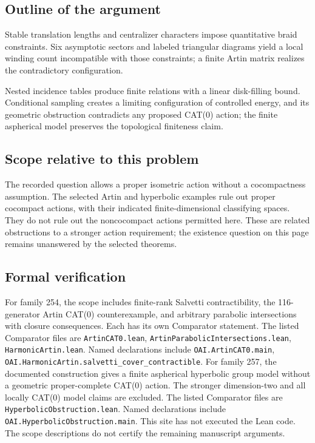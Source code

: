 \documentclass[11pt]{article}
\begin{document}
\subsection{Outline of the argument}
Stable translation lengths and centralizer characters impose quantitative braid constraints. Six asymptotic sectors and labeled triangular diagrams yield a local winding count incompatible with those constraints; a finite Artin matrix realizes the contradictory configuration.

Nested incidence tables produce finite relations with a linear disk-filling bound. Conditional sampling creates a limiting configuration of controlled energy, and its geometric obstruction contradicts any proposed CAT(0) action; the finite aspherical model preserves the topological finiteness claim.

\subsection{Scope relative to this problem}
The recorded question allows a proper isometric action without a cocompactness assumption. The selected Artin and hyperbolic examples rule out proper cocompact actions, with their indicated finite-dimensional classifying spaces. They do not rule out the noncocompact actions permitted here. These are related obstructions to a stronger action requirement; the existence question on this page remains unanswered by the selected theorems.

\subsection{Formal verification}
For family 254, the scope includes finite-rank Salvetti contractibility, the 116-generator Artin CAT(0) counterexample, and arbitrary parabolic intersections with closure consequences. Each has its own Comparator statement. The listed Comparator files are \texttt{ArtinCAT0.lean}, \texttt{ArtinParabolicIntersections.lean}, \texttt{HarmonicArtin.lean}. Named declarations include \texttt{OAI.ArtinCAT0.main}, \texttt{OAI.HarmonicArtin.salvetti\_cover\_contractible}. For family 257, the documented construction gives a finite aspherical hyperbolic group model without a geometric proper-complete CAT(0) action. The stronger dimension-two and all locally CAT(0) model claims are excluded. The listed Comparator files are \texttt{HyperbolicObstruction.lean}. Named declarations include \texttt{OAI.HyperbolicObstruction.main}. This site has not executed the Lean code. The scope descriptions do not certify the remaining manuscript arguments.
\end{document}
